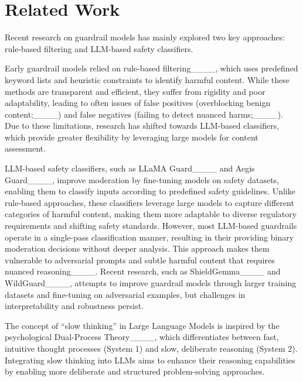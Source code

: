 \section{Related Work}
Recent research on guardrail models has mainly explored two key approaches: rule-based filtering and LLM-based safety classifiers.

Early guardrail models relied on rule-based filtering____, which uses predefined keyword lists and heuristic constraints to identify harmful content. While these methods are transparent and efficient, they suffer from rigidity and poor adaptability, leading to often issues of false positives (overblocking benign content;____) and false negatives (failing to detect nuanced harms;____). Due to these limitations, research has shifted towards LLM-based classifiers, which provide greater flexibility by leveraging large models for content assessment.

LLM-based safety classifiers, such as LLaMA Guard____ and Aegis Guard____, improve moderation by fine-tuning models on safety datasets, enabling them to classify inputs according to predefined safety guidelines. Unlike rule-based approaches, these classifiers leverage large models to capture different categories of harmful content, making them more adaptable to diverse regulatory requirements and shifting safety standards. However, most LLM-based guardrails operate in a single-pass classification manner, resulting in their providing binary moderation decisions without deeper analysis. This approach makes them vulnerable to adversarial prompts and subtle harmful content that requires nuanced reasoning____. Recent research, such as ShieldGemma____ and WildGuard____, attempts to improve guardrail models through larger training datasets and fine-tuning on adversarial examples, but challenges in interpretability and robustness persist.

The concept of ``slow thinking'' in Large Language Models is inspired by the psychological Dual-Process Theory____, which differentiates between fast, intuitive thought processes (System 1) and slow, deliberate reasoning (System 2). Integrating slow thinking into LLMs aims to enhance their reasoning capabilities by enabling more deliberate and structured problem-solving approaches.

